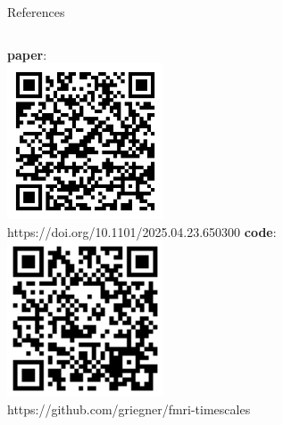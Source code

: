 \documentclass[8pt,aspectratio=169]{beamer}
\begin{document}
\begin{frame}{References}

\vfill
\begin{columns}
\centering
\textbf{paper}:\\
\includegraphics[width=0.35\textwidth]{docs/wnar/paper.png}\\
https://doi.org/10.1101/2025.04.23.650300
\centering
\textbf{code}:\\
\includegraphics[width=0.35\textwidth]{docs/wnar/code.png}\\
https://github.com/griegner/fmri-timescales
\end{columns}
\end{frame}
\end{document}
